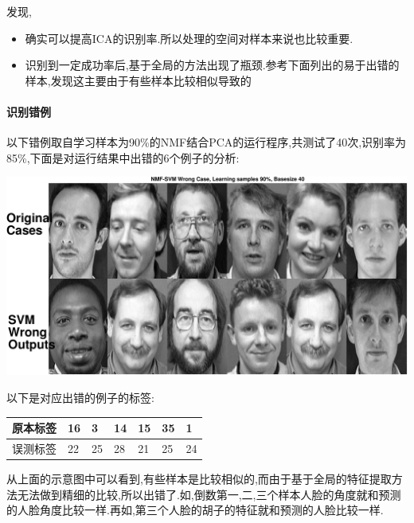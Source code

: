 	发现,
	\begin{itemize}
		\item 确实可以提高ICA的识别率.所以处理的空间对样本来说也比较重要.
		\item 识别到一定成功率后,基于全局的方法出现了瓶颈.参考下面列出的易于出错的样本,发现这主要由于有些样本比较相似导致的
	\end{itemize}
	\paragraph{识别错例}
	以下错例取自学习样本为90\%的NMF结合PCA的运行程序,共测试了40次,识别率为85\%,下面是对运行结果中出错的6个例子的分析:
	\begin{center}
	\begin{minipage}[t]{\linewidth}
	\center
	{
	\includegraphics[width=\textwidth]{Img/svm_wrong} 
	}
	\end{minipage}
	\medskip
	\end{center}
	以下是对应出错的例子的标签:
	\begin{center}
	\begin{tabular}{|l|l|l|l|l|l|l|}
\hline
原本标签&16&3&14&15&35&1\\\hline
误测标签&22&25&28&21&25&24\\\hline
\end{tabular}
\end{center}

	
	从上面的示意图中可以看到,有些样本是比较相似的,而由于基于全局的特征提取方法无法做到精细的比较,所以出错了.如,倒数第一,二,三个样本人脸的角度就和预测的人脸角度比较一样.再如,第三个人脸的胡子的特征就和预测的人脸比较一样.
	